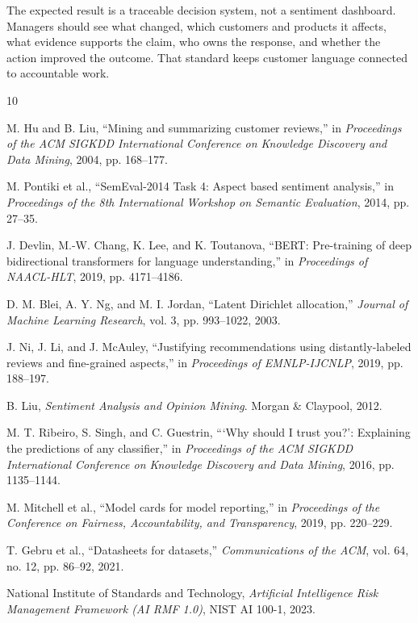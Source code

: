\documentclass[11pt,a4paper,twoside]{article}
\begin{document}
The expected result is a traceable decision system, not a sentiment dashboard. Managers should see what changed, which customers and products it affects, what evidence supports the claim, who owns the response, and whether the action improved the outcome. That standard keeps customer language connected to accountable work.

\small
\begin{thebibliography}{10}
\setlength{\itemsep}{0.12em}

M. Hu and B. Liu, ``Mining and summarizing customer reviews,'' in
\textit{Proceedings of the ACM SIGKDD International Conference on Knowledge Discovery and Data Mining}, 2004, pp. 168--177.

M. Pontiki et al., ``SemEval-2014 Task 4: Aspect based sentiment analysis,'' in
\textit{Proceedings of the 8th International Workshop on Semantic Evaluation}, 2014, pp. 27--35.

J. Devlin, M.-W. Chang, K. Lee, and K. Toutanova, ``BERT: Pre-training of deep bidirectional transformers for language understanding,'' in
\textit{Proceedings of NAACL-HLT}, 2019, pp. 4171--4186.

D. M. Blei, A. Y. Ng, and M. I. Jordan, ``Latent Dirichlet allocation,''
\textit{Journal of Machine Learning Research}, vol. 3, pp. 993--1022, 2003.

J. Ni, J. Li, and J. McAuley, ``Justifying recommendations using distantly-labeled reviews and fine-grained aspects,'' in
\textit{Proceedings of EMNLP-IJCNLP}, 2019, pp. 188--197.

B. Liu, \textit{Sentiment Analysis and Opinion Mining}. Morgan \& Claypool, 2012.

M. T. Ribeiro, S. Singh, and C. Guestrin, ```Why should I trust you?': Explaining the predictions of any classifier,'' in
\textit{Proceedings of the ACM SIGKDD International Conference on Knowledge Discovery and Data Mining}, 2016, pp. 1135--1144.

M. Mitchell et al., ``Model cards for model reporting,'' in
\textit{Proceedings of the Conference on Fairness, Accountability, and Transparency}, 2019, pp. 220--229.

T. Gebru et al., ``Datasheets for datasets,''
\textit{Communications of the ACM}, vol. 64, no. 12, pp. 86--92, 2021.

National Institute of Standards and Technology, \textit{Artificial Intelligence Risk Management Framework (AI RMF 1.0)}, NIST AI 100-1, 2023.

\end{thebibliography}
\end{document}
